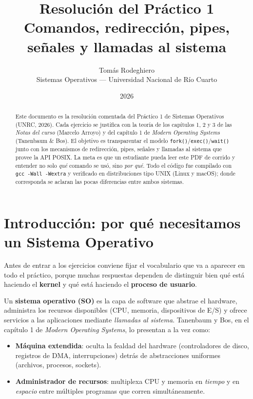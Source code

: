 \documentclass[11pt,a4paper]{article}
\title{
    \vspace{-2.5em}
    \textbf{Resolución del Práctico 1} \\[0.3em]
    \large Comandos, redirección, pipes, señales y llamadas al sistema
}
\author{
    Tomás Rodeghiero \\
    \small Sistemas Operativos --- Universidad Nacional de Río Cuarto
}
\date{2026}
\begin{document}
\maketitle

\begin{abstract}
\noindent
Este documento es la resolución comentada del Práctico 1 de Sistemas
Operativos (UNRC, 2026). Cada ejercicio se justifica con la teoría de
los capítulos 1, 2 y 3 de las \emph{Notas del curso} (Marcelo Arroyo) y
del capítulo 1 de \emph{Modern Operating Systems} (Tanenbaum \& Bos).
El objetivo es transparentar el modelo
\texttt{fork()}/\texttt{exec()}/\texttt{wait()} junto con los
mecanismos de redirección, pipes, señales y llamadas al sistema que
provee la API POSIX. La meta es que un estudiante pueda leer este PDF
de corrido y entender no solo \emph{qué} comando se usó, sino
\emph{por qué}. Todo el código fue compilado con
\texttt{gcc -Wall -Wextra} y verificado en distribuciones tipo UNIX
(Linux y macOS); donde corresponda se aclaran las pocas diferencias
entre ambos sistemas.
\end{abstract}

\tableofcontents
\bigskip

\section{Introducción: por qué necesitamos un Sistema Operativo}

Antes de entrar a los ejercicios conviene fijar el vocabulario que va a
aparecer en todo el práctico, porque muchas respuestas dependen de
distinguir bien qué está haciendo el \textbf{kernel} y qué está haciendo
el \textbf{proceso de usuario}.

Un \textbf{sistema operativo (SO)} es la capa de software que abstrae
el hardware, administra los recursos disponibles (CPU, memoria,
dispositivos de E/S) y ofrece servicios a las aplicaciones mediante
\emph{llamadas al sistema}. Tanenbaum y Bos, en el capítulo 1 de
\emph{Modern Operating Systems}, lo presentan a la vez como:

\begin{itemize}[leftmargin=*]
    \item \textbf{Máquina extendida}: oculta la fealdad del hardware
        (controladores de disco, registros de DMA, interrupciones)
        detrás de abstracciones uniformes (archivos, procesos, sockets).
    \item \textbf{Administrador de recursos}: multiplexa CPU y memoria
        en \emph{tiempo} y en \emph{espacio} entre múltiples programas
        que corren simultáneamente.
\end{itemize}
\end{document}
